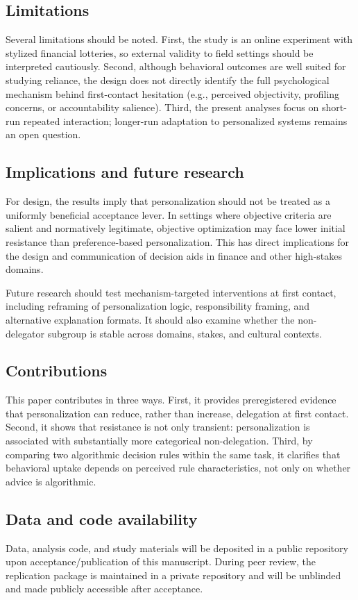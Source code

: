 \documentclass[a4paper, 12pt, fleqn]{article}
\theoremstyle{definition}
\begin{document}
\subsection{Limitations}
Several limitations should be noted. First, the study is an online experiment with stylized financial lotteries, so external validity to field settings should be interpreted cautiously. Second, although behavioral outcomes are well suited for studying reliance, the design does not directly identify the full psychological mechanism behind first-contact hesitation (e.g., perceived objectivity, profiling concerns, or accountability salience). Third, the present analyses focus on short-run repeated interaction; longer-run adaptation to personalized systems remains an open question.

\subsection{Implications and future research}
For design, the results imply that personalization should not be treated as a uniformly beneficial acceptance lever. In settings where objective criteria are salient and normatively legitimate, objective optimization may face lower initial resistance than preference-based personalization. This has direct implications for the design and communication of decision aids in finance and other high-stakes domains.

Future research should test mechanism-targeted interventions at first contact, including reframing of personalization logic, responsibility framing, and alternative explanation formats. It should also examine whether the non-delegator subgroup is stable across domains, stakes, and cultural contexts.

\subsection{Contributions}
This paper contributes in three ways. First, it provides preregistered evidence that personalization can reduce, rather than increase, delegation at first contact. Second, it shows that resistance is not only transient: personalization is associated with substantially more categorical non-delegation. Third, by comparing two algorithmic decision rules within the same task, it clarifies that behavioral uptake depends on perceived rule characteristics, not only on whether advice is algorithmic.

\subsection{Data and code availability}
Data, analysis code, and study materials will be deposited in a public repository upon acceptance/publication of this manuscript. During peer review, the replication package is maintained in a private repository and will be unblinded and made publicly accessible after acceptance.
\end{document}
